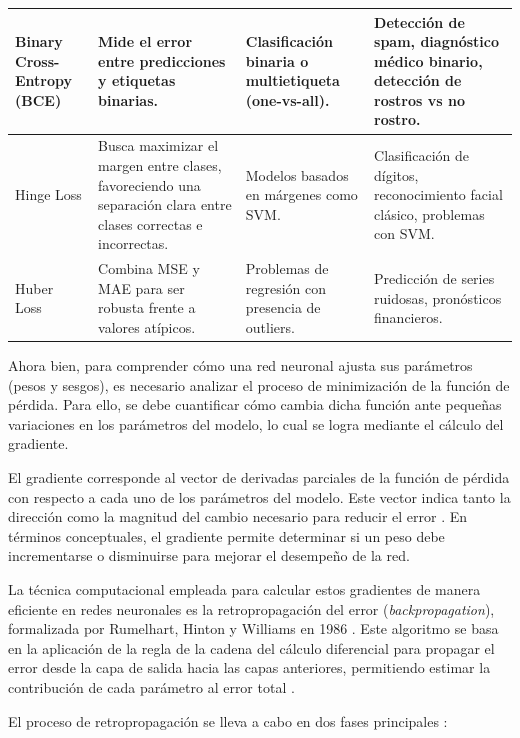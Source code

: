 \begin{longtable}{|p{2.3cm}|p{3.5cm}|p{3.2cm}|p{3.5cm}|}
		Binary Cross-Entropy (BCE) &
		Mide el error entre predicciones y etiquetas binarias. &
		Clasificación binaria o multietiqueta (one-vs-all). &
		Detección de spam, diagnóstico médico binario, detección de rostros vs no rostro. \\
		\hline
		
		Hinge Loss &
		Busca maximizar el margen entre clases, favoreciendo una separación clara entre clases correctas e incorrectas. &
		Modelos basados en márgenes como SVM. &
		Clasificación de dígitos, reconocimiento facial clásico, problemas con SVM. \\
		\hline
		
		Huber Loss &
		Combina MSE y MAE para ser robusta frente a valores atípicos. &
		Problemas de regresión con presencia de outliers. &
		Predicción de series ruidosas, pronósticos financieros. \\
		\hline
		
	\end{longtable}
	
	
	Ahora bien, para comprender cómo una red neuronal ajusta sus parámetros (pesos y sesgos), es necesario analizar el proceso de minimización de la función de pérdida. Para ello, se debe cuantificar cómo cambia dicha función ante pequeñas variaciones en los parámetros del modelo, lo cual se logra mediante el cálculo del gradiente.
	
	El gradiente corresponde al vector de derivadas parciales de la función de pérdida con respecto a cada uno de los parámetros del modelo. Este vector indica tanto la dirección como la magnitud del cambio necesario para reducir el error \cite{bishop2006, goodfellow2016dl}. En términos conceptuales, el gradiente permite determinar si un peso debe incrementarse o disminuirse para mejorar el desempeño de la red.
	
	La técnica computacional empleada para calcular estos gradientes de manera eficiente en redes neuronales es la retropropagación del error (\textit{backpropagation}), formalizada por Rumelhart, Hinton y Williams en 1986 \cite{rumelhart1986}. Este algoritmo se basa en la aplicación de la regla de la cadena del cálculo diferencial para propagar el error desde la capa de salida hacia las capas anteriores, permitiendo estimar la contribución de cada parámetro al error total \cite{goodfellow2016dl, rumelhart1986}.
	
	El proceso de retropropagación se lleva a cabo en dos fases principales \cite{goodfellow2016dl, geron2019}:
	

